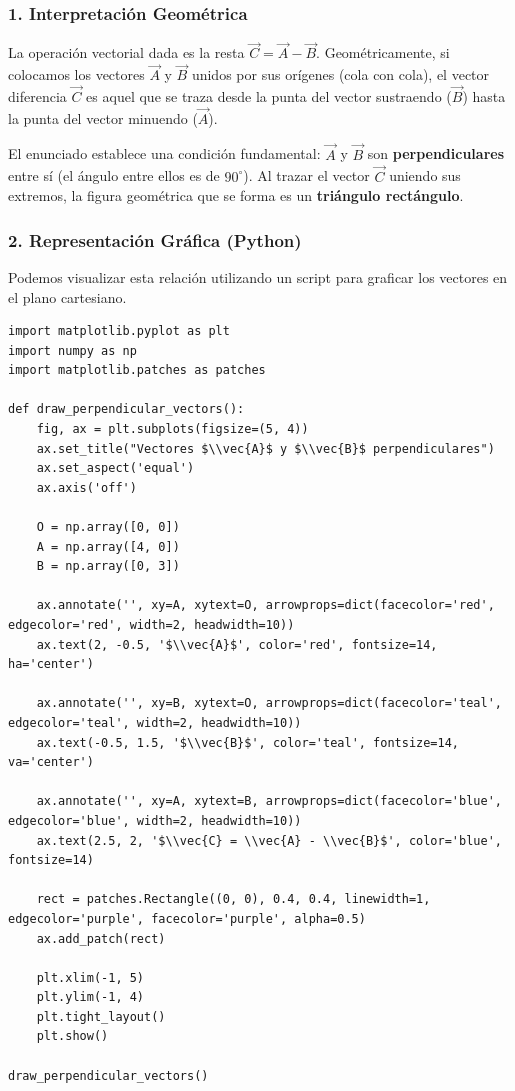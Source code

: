 \documentclass[12pt, a4paper]{article}
\begin{document}
\subsubsection*{1. Interpretación Geométrica}
La operación vectorial dada es la resta $\vec{C} = \vec{A} - \vec{B}$. Geométricamente, si colocamos los vectores $\vec{A}$ y $\vec{B}$ unidos por sus orígenes (cola con cola), el vector diferencia $\vec{C}$ es aquel que se traza desde la punta del vector sustraendo ($\vec{B}$) hasta la punta del vector minuendo ($\vec{A}$).

El enunciado establece una condición fundamental: $\vec{A}$ y $\vec{B}$ son \textbf{perpendiculares} entre sí (el ángulo entre ellos es de $90^\circ$). Al trazar el vector $\vec{C}$ uniendo sus extremos, la figura geométrica que se forma es un \textbf{triángulo rectángulo}.

\subsubsection*{2. Representación Gráfica (Python)}
Podemos visualizar esta relación utilizando un script para graficar los vectores en el plano cartesiano.

\begin{lstlisting}
import matplotlib.pyplot as plt
import numpy as np
import matplotlib.patches as patches

def draw_perpendicular_vectors():
    fig, ax = plt.subplots(figsize=(5, 4))
    ax.set_title("Vectores $\\vec{A}$ y $\\vec{B}$ perpendiculares")
    ax.set_aspect('equal')
    ax.axis('off')

    O = np.array([0, 0])
    A = np.array([4, 0])
    B = np.array([0, 3])

    ax.annotate('', xy=A, xytext=O, arrowprops=dict(facecolor='red', edgecolor='red', width=2, headwidth=10))
    ax.text(2, -0.5, '$\\vec{A}$', color='red', fontsize=14, ha='center')

    ax.annotate('', xy=B, xytext=O, arrowprops=dict(facecolor='teal', edgecolor='teal', width=2, headwidth=10))
    ax.text(-0.5, 1.5, '$\\vec{B}$', color='teal', fontsize=14, va='center')

    ax.annotate('', xy=A, xytext=B, arrowprops=dict(facecolor='blue', edgecolor='blue', width=2, headwidth=10))
    ax.text(2.5, 2, '$\\vec{C} = \\vec{A} - \\vec{B}$', color='blue', fontsize=14)

    rect = patches.Rectangle((0, 0), 0.4, 0.4, linewidth=1, edgecolor='purple', facecolor='purple', alpha=0.5)
    ax.add_patch(rect)

    plt.xlim(-1, 5)
    plt.ylim(-1, 4)
    plt.tight_layout()
    plt.show()

draw_perpendicular_vectors()
\end{lstlisting}
\end{document}
